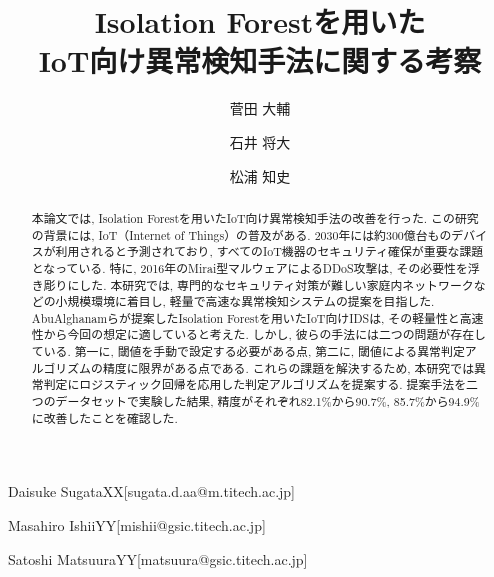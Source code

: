 \documentclass{css}
\begin{document}

\title{Isolation Forestを用いた\\IoT向け異常検知手法に関する考察}



\author{菅田 大輔}{Daisuke Sugata}{XX}[sugata.d.aa@m.titech.ac.jp]
\author{石井 将大}{Masahiro Ishii}{YY}[mishii@gsic.titech.ac.jp]
\author{松浦 知史}{Satoshi Matsuura}{YY}[matsuura@gsic.titech.ac.jp]



\begin{abstract}
    本論文では, Isolation Forestを用いたIoT向け異常検知手法の改善を行った. この研究の背景には, IoT（Internet of Things）の普及がある. 2030年には約300億台ものデバイスが利用されると予測されており, すべてのIoT機器のセキュリティ確保が重要な課題となっている. 特に, 2016年のMirai型マルウェアによるDDoS攻撃は, その必要性を浮き彫りにした. 本研究では, 専門的なセキュリティ対策が難しい家庭内ネットワークなどの小規模環境に着目し, 軽量で高速な異常検知システムの提案を目指した. AbuAlghanamらが提案したIsolation Forestを用いたIoT向けIDSは, その軽量性と高速性から今回の想定に適していると考えた. しかし, 彼らの手法には二つの問題が存在している. 第一に, 閾値を手動で設定する必要がある点, 第二に, 閾値による異常判定アルゴリズムの精度に限界がある点である. これらの課題を解決するため, 本研究では異常判定にロジスティック回帰を応用した判定アルゴリズムを提案する. 提案手法を二つのデータセットで実験した結果, 精度がそれぞれ82.1\%から90.7\%, 85.7\%から94.9\%に改善したことを確認した. 
\end{abstract}
\end{document}
